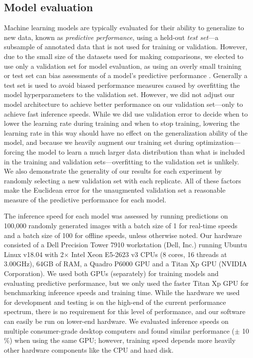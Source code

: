 \documentclass[11pt,a4paper,oneside]{book}
\begin{document}
\begin{doublespace}
\subsection{Model evaluation}
Machine learning models are typically evaluated for their ability to generalize to new data, known as \textit{predictive performance}, using a held-out \textit{test set}—a subsample of annotated data that is not used for training or validation. However, due to the small size of the datasets used for making comparisons, we elected to use only a validation set for model evaluation, as using an overly small training or test set can bias assessments of a model's predictive performance \citep{kuhn2013applied}. Generally a test set is used to avoid biased performance measures caused by overfitting the model hyperparameters to the validation set. However, we did not adjust our model architecture to achieve better performance on our validation set—only to achieve fast inference speeds. While we did use validation error to decide when to lower the learning rate during training and when to stop training, lowering the learning rate in this way should have no effect on the generalization ability of the model, and because we heavily augment our training set during optimization---forcing the model to learn a much larger data distribution than what is included in the training and validation sets—overfitting to the validation set is unlikely. We also demonstrate the generality of our results for each experiment by randomly selecting a new validation set with each replicate. All of these factors make the Euclidean error for the unaugmented validation set a reasonable measure of the predictive performance for each model. 

The inference speed for each model was assessed by running predictions on 100,000 randomly generated images with a batch size of 1 for real-time speeds and a batch size of 100 for offline speeds, unless otherwise noted. Our hardware consisted of a Dell Precision Tower 7910 workstation (Dell, Inc.) running Ubuntu Linux v18.04 with 2$\times$ Intel Xeon E5-2623 v3 CPUs (8 cores, 16 threads at 3.00GHz), 64GB of RAM, a Quadro P6000 GPU and a Titan Xp GPU (NVIDIA Corporation). We used both GPUs (separately) for training models and evaluating predictive performance, but we only used the faster Titan Xp GPU for benchmarking inference speeds and training time. While the hardware we used for development and testing is on the high-end of the current performance spectrum, there is no requirement for this level of performance, and our software can easily be run on lower-end hardware. We evaluated inference speeds on multiple consumer-grade desktop computers and found similar performance ($
\pm$ 10$\%$) when using the same GPU; however, training speed depends more heavily other hardware components like the CPU and hard disk. 


\end{doublespace}
\end{document}
